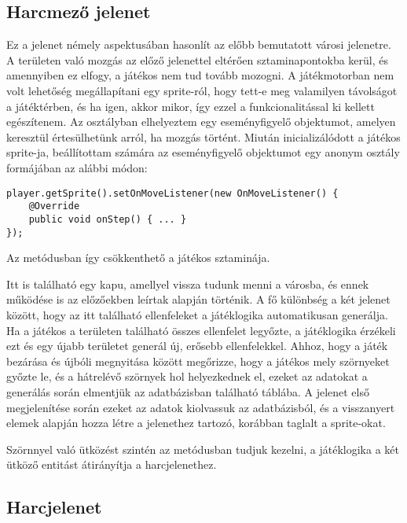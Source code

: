 \subsection*{Harcmező jelenet}
\label{harcmezo}
Ez a jelenet némely aspektusában hasonlít az előbb bemutatott városi jelenetre. 
A területen való mozgás az előző jelenettel eltérően sztaminapontokba kerül, és amennyiben ez elfogy, a játékos nem tud tovább mozogni. 
A játékmotorban nem volt lehetőség megállapítani egy sprite-ról, hogy tett-e meg valamilyen távolságot a játéktérben, és ha igen, akkor mikor, így ezzel a funkcionalitással ki kellett egészítenem. 
Az  osztályban elhelyeztem egy eseményfigyelő objektumot, amelyen keresztül értesülhetünk arról, ha mozgás történt. 
Miután inicializálódott a játékos sprite-ja, beállítottam számára az eseményfigyelő objektumot egy anonym osztály formájában az alábbi módon:
\begin{lstlisting}
player.getSprite().setOnMoveListener(new OnMoveListener() {
    @Override
    public void onStep() { ... }
});
\end{lstlisting}
Az  metódusban így csökkenthető a játékos sztaminája. 

Itt is található egy kapu, amellyel vissza tudunk menni a városba, és ennek működése is az előzőekben leírtak alapján történik. 
A fő különbség a két jelenet között, hogy az itt található ellenfeleket a játéklogika automatikusan generálja. 
Ha a játékos a területen található összes ellenfelet legyőzte, a játéklogika érzékeli ezt és egy újabb területet generál új, erősebb ellenfelekkel. 
Ahhoz, hogy a játék bezárása és újbóli megnyitása között megőrizze, hogy a játékos mely szörnyeket győzte le, és a hátrelévő szörnyek hol helyezkednek el, ezeket az adatokat a generálás során elmentjük az adatbázisban található  táblába. 
A jelenet első megjelenítése során ezeket az adatok kiolvassuk az adatbázisból, és a visszanyert elemek alapján hozza létre a jelenethez tartozó, korábban taglalt  a sprite-okat. 

Szörnnyel való ütközést szintén az  metódusban tudjuk kezelni, a játéklogika a két ütköző entitást átirányítja a harcjelenethez. 

\subsection*{Harcjelenet}
\label{harc}

